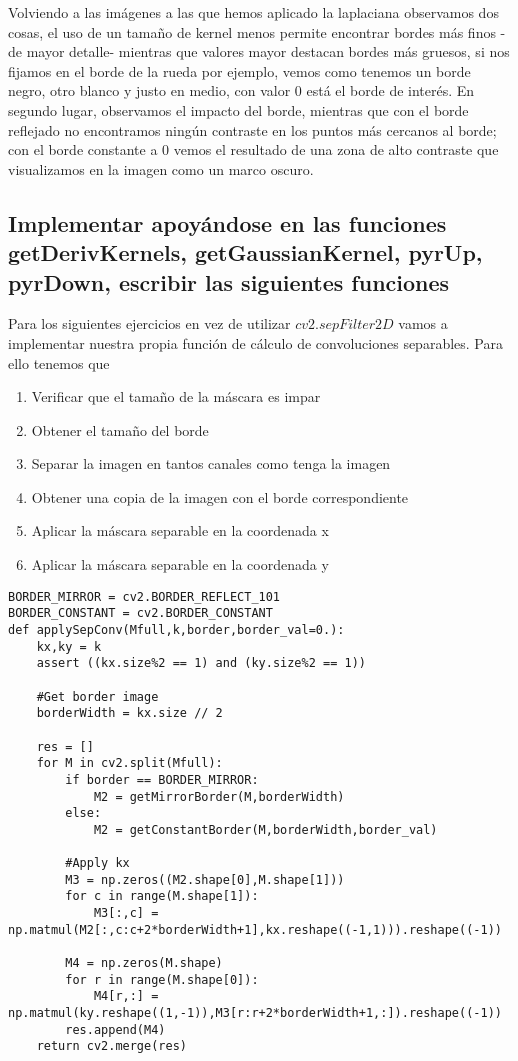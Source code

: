 \documentclass{article}
\begin{document}
Volviendo a las imágenes a las que hemos aplicado la laplaciana observamos dos cosas, el uso de un tamaño de kernel menos permite encontrar bordes más finos -de mayor detalle- mientras que valores mayor destacan bordes más gruesos, si nos fijamos en el borde de la rueda por ejemplo, vemos como tenemos un borde negro, otro blanco y justo en medio, con valor 0 está el borde de interés. En segundo lugar, observamos el impacto del borde, mientras que con el borde reflejado no encontramos ningún contraste en los puntos más cercanos al borde; con el borde constante a 0 vemos el resultado de una zona de alto contraste que visualizamos en la imagen como un marco oscuro.  

\subsection{Implementar apoyándose en las funciones getDerivKernels, getGaussianKernel, pyrUp, pyrDown, escribir las siguientes funciones}

Para los siguientes ejercicios en vez de utilizar $cv2.sepFilter2D$ vamos a implementar nuestra propia función de cálculo de convoluciones separables. Para ello tenemos que 

\begin{enumerate}
\item Verificar que el tamaño de la máscara es impar
\item Obtener el tamaño del borde
\item Separar la imagen en tantos canales como tenga la imagen
\item Obtener una copia de la imagen con el borde correspondiente
\item Aplicar la máscara separable en la coordenada x
\item Aplicar la máscara separable en la coordenada y
\end{enumerate}

\begin{lstlisting}
BORDER_MIRROR = cv2.BORDER_REFLECT_101
BORDER_CONSTANT = cv2.BORDER_CONSTANT
def applySepConv(Mfull,k,border,border_val=0.):
    kx,ky = k
    assert ((kx.size%2 == 1) and (ky.size%2 == 1))

    #Get border image
    borderWidth = kx.size // 2

    res = []
    for M in cv2.split(Mfull):
        if border == BORDER_MIRROR:
            M2 = getMirrorBorder(M,borderWidth)
        else:
            M2 = getConstantBorder(M,borderWidth,border_val)

        #Apply kx
        M3 = np.zeros((M2.shape[0],M.shape[1]))
        for c in range(M.shape[1]):
            M3[:,c] = np.matmul(M2[:,c:c+2*borderWidth+1],kx.reshape((-1,1))).reshape((-1))

        M4 = np.zeros(M.shape)
        for r in range(M.shape[0]):
            M4[r,:] = np.matmul(ky.reshape((1,-1)),M3[r:r+2*borderWidth+1,:]).reshape((-1))
        res.append(M4)
    return cv2.merge(res)
\end{lstlisting}
\end{document}
